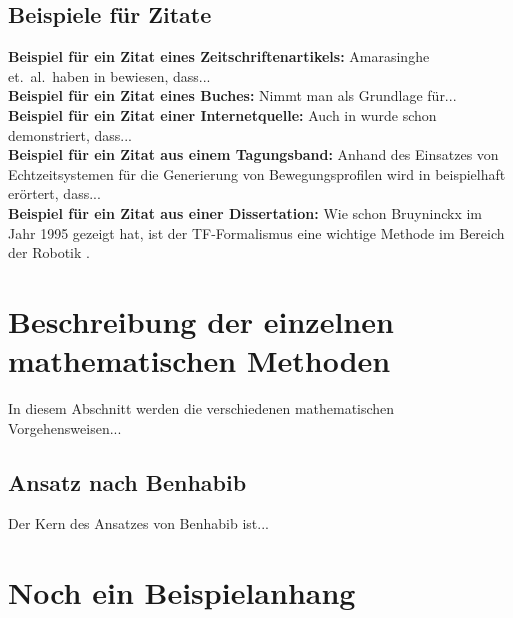 \documentclass[german, 10pt]{report}
\begin{document}
\section{Beispiele f\"{u}r Zitate}
\label{S_ZitatBeispiele}{\bf Beispiel f\"{u}r ein Zitat eines
Zeitschriftenartikels:} Amarasinghe et.~al.~haben in
\cite{Amarasinghe:07} bewiesen, dass...\\

{\bf Beispiel f\"{u}r ein Zitat eines Buches:} Nimmt man
\cite{Baeten:04} als Grundlage f\"{u}r...\\

{\bf Beispiel f\"{u}r ein Zitat einer Internetquelle:} Auch in \cite{Autosar:05} wurde schon demonstriert, dass...\\

{\bf Beispiel f\"{u}r ein Zitat aus einem Tagungsband:} Anhand des
Einsatzes von Echtzeitsystemen f\"{u}r die Generierung von
Bewegungsprofilen wird in \cite{Benhabib:04} beispielhaft er\"{o}rtert,
dass...\\

{\bf Beispiel f\"{u}r ein Zitat aus einer Dissertation:} Wie schon
Bruyninckx im Jahr 1995 gezeigt hat, ist der TF-Formalismus eine
wichtige Methode im Bereich der Robotik \cite{Bruyninckx:95}.\\


\begin{appendix}

\chapter{Beschreibung der einzelnen mathematischen Methoden}
\label{C_MathMethoden} In diesem Abschnitt werden die verschiedenen
mathematischen Vorgehensweisen...


\section{Ansatz nach Benhabib}
Der Kern des Ansatzes von Benhabib \cite{Benhabib:04} ist...


\chapter{Noch ein Beispielanhang}
\label{C_BeispielAnhang}


\end{appendix}
\end{document}
